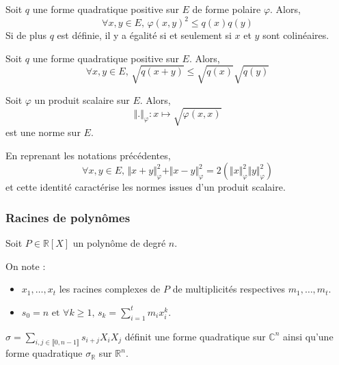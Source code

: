 
	\begin{proposition}
		Soit $q$ une forme quadratique positive sur $E$ de forme polaire $\varphi$. Alors,
		\[ \forall x, y \in E, \, \varphi(x, y)^2 \leq q(x) q(y) \]
		Si de plus $q$ est définie, il y a égalité si et seulement si $x$ et $y$ sont colinéaires.
	\end{proposition}

	\begin{proposition}
		Soit $q$ une forme quadratique positive sur $E$. Alors,
		\[ \forall x, y \in E, \, \sqrt{q(x + y)} \leq \sqrt{q(x)} \sqrt{q(y)} \]
	\end{proposition}

	\begin{corollary}
		Soit $\varphi$ un produit scalaire sur $E$. Alors,
		\[ \Vert . \Vert_{\varphi} : x \mapsto \sqrt{\varphi(x, x)} \]
		est une norme sur $E$.
	\end{corollary}


	\begin{proposition}
		En reprenant les notations précédentes,
		\[ \forall x, y \in E, \, \Vert x + y \Vert_{\varphi}^2 + \Vert x - y \Vert_{\varphi}^2 = 2(\Vert x \Vert_{\varphi}^2 \Vert y \Vert_{\varphi}^2) \]
		et cette identité caractérise les normes issues d'un produit scalaire.
	\end{proposition}

	\subsubsection{Racines de polynômes}


	Soit $P \in \mathbb{R}[X]$ un polynôme de degré $n$.

	\begin{notation}
		On note :
		\begin{itemize}
			\item $x_1, \dots, x_t$ les racines complexes de $P$ de multiplicités respectives $m_1, \dots, m_t$.
			\item $s_0 = n \text{ et } \forall k \geq 1, \, s_k = \sum_{i=1}^t m_i x_i^k$.
		\end{itemize}
	\end{notation}

	\begin{proposition}
		$\sigma = \sum_{i, j \in \llbracket 0, n-1 \rrbracket} s_{i+j} X_i X_j$ définit une forme quadratique sur $\mathbb{C}^n$ ainsi qu'une forme quadratique $\sigma_{\mathbb{R}}$ sur $\mathbb{R}^n$.
	\end{proposition}


